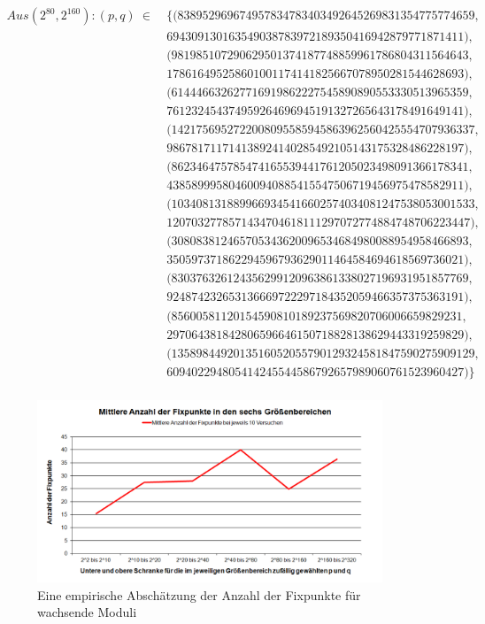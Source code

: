 \begin{refsegment}
\begin{equation*}
  \begin{split}
Aus (2^{80}, 2^{160}): (p,q)~\in~
   & \{ (838952969674957834783403492645269831354775774659,\\
   &     694309130163549038783972189350416942879771871411),\\
   &    (981985107290629501374187748859961786804311564643,\\
   &     178616495258601001174141825667078950281544628693),\\
   &    (614446632627716919862227545890890553330513965359,\\
   &     761232454374959264696945191327265643178491649141),\\
   &    (1421756952722008095585945863962560425554707936337,\\
   &     986781711714138924140285492105143175328486228197),\\
   &    (862346475785474165539441761205023498091366178341,\\
   &     438589995804600940885415547506719456975478582911),\\
   &    (1034081318899669345416602574034081247538053001533,\\
   &     1207032778571434704618111297072774884748706223447),\\
   &    (308083812465705343620096534684980088954958466893,\\
   &     350597371862294596793629011464584694618569736021),\\
   &    (830376326124356299120963861338027196931951857769,\\
   &     924874232653136669722297184352059466357375363191),\\
   &    (85600581120154590810189237569820706006659829231,\\
   &     297064381842806596646150718828138629443319259829),\\
   &    (1358984492013516052055790129324581847590275909129,\\
   &     609402294805414245544586792657989060761523960427) \}\\
  \end{split}
\end{equation*}


\begin{figure}[!htb]  %
  \centering
   \includegraphics[width=0.92\textwidth]{figures/MAF.png}
  \caption{Eine empirische Abschätzung der Anzahl der Fixpunkte für wachsende Moduli}
  \label{fig:NumberFixpointsGrowingN}
\end{figure}


\end{refsegment}
